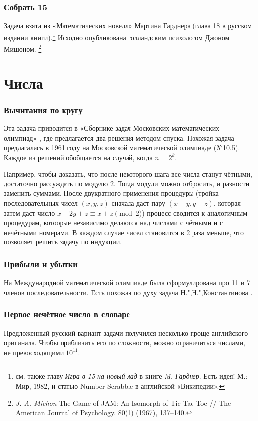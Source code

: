 \documentclass[twoside]{book}
\begin{document}
\subsubsection*{Собрать 15} %
Задача взята из «Математических новелл» Мартина Гарднера (глава 18 в русском издании книги).\footnote{см. также главу \emph{Игра в 15 на новый лад} в книге \emph{M. Гарднер}. Есть идея! М.: Мир, 1982, и статью Number Scrabble в английской «Википедии».}
Исходно опубликована голландским психологом Джоном Мишоном.%
\footnote{\emph{J. A. Michon} The Game of JAM: An Isomorph of Tic-Tac-Toe /\!/ The American Journal of Psychology. 80(1) (1967), 137--140.}

\section{Числа}

\subsubsection*{Вычитания по кругу}
Эта задача приводится в «Сборнике задач Московских математических олимпиад» \cite[№257, с. 73]{сборникМ}, где предлагается два решения методом спуска.
Похожая задача предлагалась в 1961 году на Московской математической олимпиаде (№10.5). 
Каждое из решений обобщается на случай, когда $n=2^k$.

Например, чтобы доказать, что после некоторого шага все числа станут чётными, достаточно рассуждать по модулю $2$.
Тогда модули можно отбросить, и разности  заменить суммами.
После двукратного применения процедуры (тройка последовательных чисел $(x,y,z)$ сначала даст пару $(x+y,y+z)$, которая затем даст число $x+2y+z\equiv x+z \pmod{2}$) процесс сводится к аналогичным  процедурам, котоорые независимо делаются над числами с чётными и с нечётными номерами. В каждом случае чисел становится в 2 раза меньше, что позволяет решить задачу по индукции.

\subsubsection{Прибыли и убытки}
На Международной математической олимпиаде была сформулирована про 11 и 7 членов последовательности.
Есть похожая по духу задача Н.",Н.",Константинова \cite[№~73652]{problems}.

\subsubsection{Первое нечётное число в словаре}
Предложенный русский вариант задачи получился несколько проще английского оригинала.
Чтобы приблизить его по сложности, можно ограничиться числами, не превосходящими $10^{11}$.
\end{document}
